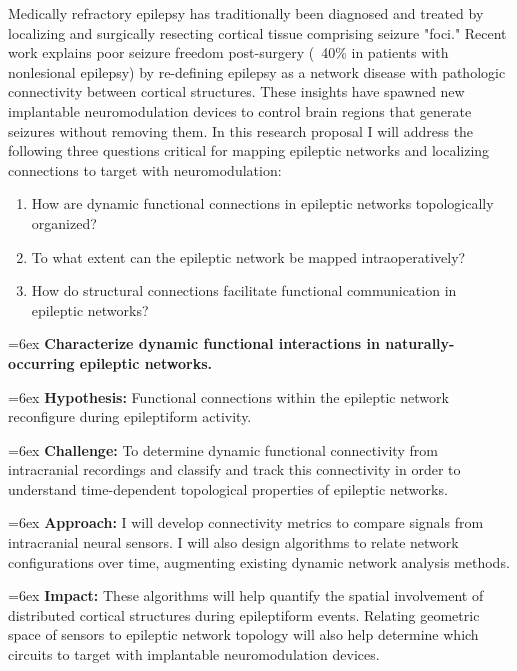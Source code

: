 Medically refractory epilepsy has traditionally been diagnosed and treated by localizing and surgically resecting cortical tissue comprising seizure "foci." Recent work explains poor seizure freedom post-surgery (~40\% in patients with nonlesional epilepsy) by re-defining epilepsy as a network disease with pathologic connectivity between cortical structures. These insights have spawned new implantable neuromodulation devices to control brain regions that generate seizures without removing them. In this research proposal I will address the following three questions critical for mapping epileptic networks and localizing connections to target with neuromodulation:
\begin{enumerate}[topsep=0pt, itemsep=0pt]
    \item How are dynamic functional connections in epileptic networks topologically organized?
    \item To what extent can the epileptic network be mapped intraoperatively?
    \item How do structural connections facilitate functional communication in epileptic networks?
\end{enumerate}



\hangindent=6ex
\noindent
{} \textbf{Characterize dynamic functional interactions in naturally-occurring epileptic networks.}

\hangindent=6ex
\textbf{Hypothesis:} Functional connections within the epileptic network reconfigure during epileptiform activity.

\hangindent=6ex
\textbf{Challenge:} To determine dynamic functional connectivity from intracranial recordings and classify and track this connectivity in order to understand time-dependent topological properties of epileptic networks.

\hangindent=6ex
\textbf{Approach:} I will develop connectivity metrics to compare signals from intracranial neural sensors. I will also design algorithms to relate network configurations over time, augmenting existing dynamic network analysis methods.

\hangindent=6ex
\textbf{Impact:} These algorithms will help quantify the spatial involvement of distributed cortical structures during epileptiform events. Relating geometric space of sensors to epileptic network topology will also help determine which circuits to target with implantable neuromodulation devices.


